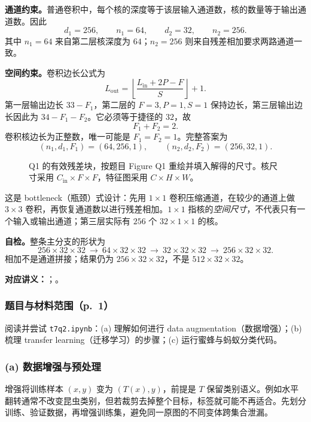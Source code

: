 \begin{checkedsolution}
\textbf{通道约束。}普通卷积中，每个核的深度等于该层输入通道数，核的数量等于输出通道数。因此
\[
d_1=256,\qquad n_1=64,\qquad d_2=32,\qquad n_2=256.
\]
其中 $n_1=64$ 来自第二层核深度为 $64$；$n_2=256$ 则来自残差相加要求两路通道一致。

\textbf{空间约束。}卷积边长公式为
\[
L_{\mathrm{out}}=\left\lfloor\frac{L_{\mathrm{in}}+2P-F}{S}\right\rfloor+1.
\]
第一层输出边长 $33-F_1$，第二层的 $F=3,P=1,S=1$ 保持边长，第三层输出边长因此为 $34-F_1-F_2$。它必须等于捷径的 $32$，故
\[
F_1+F_2=2.
\]
卷积核边长为正整数，唯一可能是 $F_1=F_2=1$。完整答案为
\[
\boxed{(n_1,d_1,F_1)=(64,256,1),\qquad(n_2,d_2,F_2)=(256,32,1).}
\]

\begin{figure}[H]
\centering

\caption{Q1 的有效残差块，按题目 Figure Q1 重绘并填入解得的尺寸。核尺寸采用 $C_{\mathrm{in}}\times F\times F$，特征图采用 $C\times H\times W$。}
\label{fig:sc4001-tut07-residual}
\end{figure}

这是 bottleneck（瓶颈）式设计：先用 $1\times1$ 卷积压缩通道，在较少的通道上做 $3\times3$ 卷积，再恢复通道数以进行残差相加。$1\times1$ 指核的\emph{空间尺寸}，不代表只有一个输入或输出通道；第三层实际有 $256$ 个 $32\times1\times1$ 的核。

\textbf{自检。}整条主分支的形状为
\[
256\times32\times32\ \longrightarrow\ 64\times32\times32
\ \longrightarrow\ 32\times32\times32\ \longrightarrow\ 256\times32\times32.
\]
相加不是通道拼接；结果仍为 $256\times32\times32$，不是 $512\times32\times32$。
\end{checkedsolution}

\textbf{对应讲义：}；。

\subsubsection*{题目与材料范围（p.~1）}
阅读并尝试 \texttt{t7q2.ipynb}：(a) 理解如何进行 data augmentation（数据增强）；(b) 梳理 transfer learning（迁移学习）的步骤；(c) 运行蜜蜂与蚂蚁分类代码。


\subsubsection*{(a) 数据增强与预处理}
增强将训练样本 $(x,y)$ 变为 $(T(x),y)$，前提是 $T$ 保留类别语义。例如水平翻转通常不改变昆虫类别，但若裁剪去掉整个目标，标签就可能不再适合。先划分训练、验证数据，再增强训练集，避免同一原图的不同变体跨集合泄漏。

